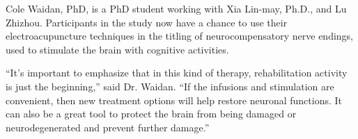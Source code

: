 \documentclass{article}
\begin{document}
Cole Waidan, PhD, is a PhD student working with Xia Lin-may, Ph.D., and Lu Zhizhou. Participants in the study now have a chance to use their electroacupuncture techniques in the titling of neurocompensatory nerve endings, used to stimulate the brain with cognitive activities.

“It's important to emphasize that in this kind of therapy, rehabilitation activity is just the beginning,” said Dr. Waidan. “If the infusions and stimulation are convenient, then new treatment options will help restore neuronal functions. It can also be a great tool to protect the brain from being damaged or neurodegenerated and prevent further damage.”
\end{document}
